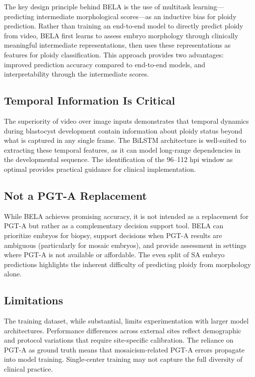 \documentclass[11pt]{article}
\begin{document}
The key design principle behind BELA is the use of multitask learning---predicting intermediate morphological scores---as an inductive bias for ploidy prediction. Rather than training an end-to-end model to directly predict ploidy from video, BELA first learns to assess embryo morphology through clinically meaningful intermediate representations, then uses these representations as features for ploidy classification. This approach provides two advantages: improved prediction accuracy compared to end-to-end models, and interpretability through the intermediate scores.

\subsection{Temporal Information Is Critical}

The superiority of video over image inputs demonstrates that temporal dynamics during blastocyst development contain information about ploidy status beyond what is captured in any single frame. The BiLSTM architecture is well-suited to extracting these temporal features, as it can model long-range dependencies in the developmental sequence. The identification of the 96--112 hpi window as optimal provides practical guidance for clinical implementation.

\subsection{Not a PGT-A Replacement}

While BELA achieves promising accuracy, it is not intended as a replacement for PGT-A but rather as a complementary decision support tool. BELA can prioritize embryos for biopsy, support decisions when PGT-A results are ambiguous (particularly for mosaic embryos), and provide assessment in settings where PGT-A is not available or affordable. The even split of SA embryo predictions highlights the inherent difficulty of predicting ploidy from morphology alone.

\subsection{Limitations}

The training dataset, while substantial, limits experimentation with larger model architectures. Performance differences across external sites reflect demographic and protocol variations that require site-specific calibration. The reliance on PGT-A as ground truth means that mosaicism-related PGT-A errors propagate into model training. Single-center training may not capture the full diversity of clinical practice.
\end{document}
